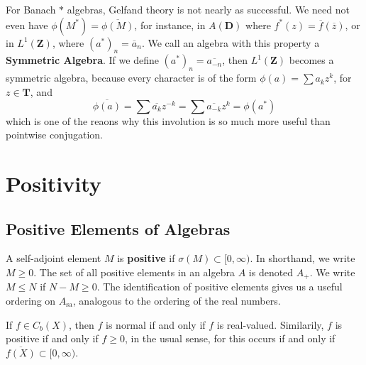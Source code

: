 For Banach $*$ algebras, Gelfand theory is not nearly as successful. We need not even have $\phi(M^*) = \overline{\phi(M)}$, for instance, in $A(\mathbf{D})$ where $f^*(z) = \overline{f}(\overline{z})$, or in $L^1(\mathbf{Z})$, where $(a^*)_n = \overline{a}_n$. We call an algebra with this property a {\bf Symmetric Algebra}. If we define $(a^*)_n = \overline{a_{-n}}$, then $L^1(\mathbf{Z})$ becomes a symmetric algebra, because every character is of the form $\phi(a) = \sum a_k z^k$, for $z \in \mathbf{T}$, and
%
\[ \overline{\phi(a)} = \sum \overline{a_k} z^{-k} = \sum \overline{a_{-k}} z^k = \phi(a^*) \]
%
which is one of the reaons why this involution is so much more useful than pointwise conjugation.




\section{Positivity}

\subsection{Positive Elements of Algebras}

A self-adjoint element $M$ is {\bf positive} if $\sigma(M) \subset [0, \infty)$. In shorthand, we write $M \geq 0$. The set of all positive elements in an algebra $A$ is denoted $A_+$. We write $M \leq N$ if $N - M \geq 0$. The identification of positive elements gives us a useful ordering on $A_{\text{sa}}$, analogous to the ordering of the real numbers.

\begin{example}
    If $f \in C_b(X)$, then $f$ is normal if and only if $f$ is real-valued. Similarily, $f$ is positive if and only if $f \geq 0$, in the usual sense, for this occurs if and only if $\overline{f(X)} \subset [0,\infty)$.
\end{example}

